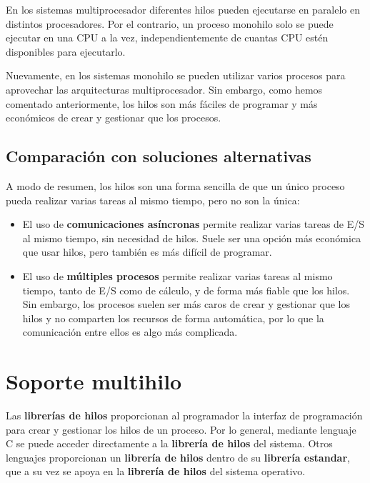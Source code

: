 En los sistemas multiprocesador diferentes hilos pueden ejecutarse en
paralelo en distintos procesadores. Por el contrario, un proceso
monohilo solo se puede ejecutar en una CPU a la vez, independientemente
de cuantas CPU estén disponibles para ejecutarlo.

Nuevamente, en los sistemas monohilo se pueden utilizar varios procesos
para aprovechar las arquitecturas multiprocesador. Sin embargo, como
hemos comentado anteriormente, los hilos son más fáciles de programar y
más económicos de crear y gestionar que los procesos.

\subsection{Comparación con soluciones
alternativas}\label{_comparaciuxf3n_con_soluciones_alternativas}

A modo de resumen, los hilos son una forma sencilla de que un único
proceso pueda realizar varias tareas al mismo tiempo, pero no son la
única:

\begin{itemize}
\item
  El uso de \textbf{comunicaciones asíncronas} permite realizar varias
  tareas de E/S al mismo tiempo, sin necesidad de hilos. Suele ser una
  opción más económica que usar hilos, pero también es más difícil de
  programar.
\item
  El uso de \textbf{múltiples procesos} permite realizar varias tareas
  al mismo tiempo, tanto de E/S como de cálculo, y de forma más fiable
  que los hilos. Sin embargo, los procesos suelen ser más caros de crear
  y gestionar que los hilos y no comparten los recursos de forma
  automática, por lo que la comunicación entre ellos es algo más
  complicada.
\end{itemize}

\section{Soporte multihilo}\label{_soporte_multihilo}

Las \textbf{librerías de hilos}{} proporcionan al programador la
interfaz de programación para crear y gestionar los hilos de un proceso.
Por lo general, mediante lenguaje C se puede acceder directamente a la
\textbf{librería de hilos} del sistema. Otros lenguajes proporcionan un
\textbf{librería de hilos} dentro de su \textbf{librería estandar}, que
a su vez se apoya en la \textbf{librería de hilos} del sistema
operativo.

